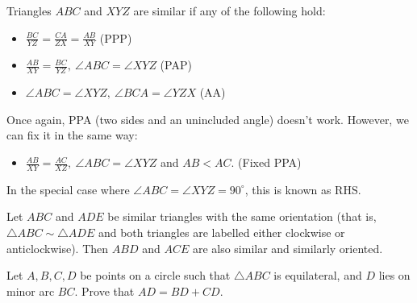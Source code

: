    Triangles $ABC$ and $XYZ$ are similar if any of the following hold:
  \begin{itemize}
    \item $\frac{BC}{YZ}=\frac{CA}{ZX}=\frac{AB}{XY}$ (PPP)
    \item $\frac{AB}{XY}=\frac{BC}{YZ},\ \angle ABC=\angle XYZ$ (PAP)
    \item $\angle ABC=\angle XYZ,\ \angle BCA=\angle YZX$ (AA)
  \end{itemize}
  Once again, PPA (two sides and an unincluded angle) doesn't work. However, we
  can fix it in the same way:
  \begin{itemize}
    \item $\frac{AB}{XY}=\frac{AC}{XZ},\ \angle ABC=\angle XYZ$ and $AB<AC$.
      (Fixed PPA)
  \end{itemize}
  In the special case where $\angle ABC=\angle XYZ=90^\circ$, this is
  known as RHS\@.
  \begin{result}{\label{r:b:g:s:1}}
  Let $ABC$ and $ADE$ be similar triangles with the same orientation (that is,
  $\triangle ABC\sim\triangle ADE$ and both triangles are labelled either
  clockwise or anticlockwise). Then $ABD$ and $ACE$ are also similar and
  similarly oriented.
\end{result}
\begin{problem}{\label{p:b:g:s:1}}
  Let $A,B,C,D$ be points on a circle such that $\triangle ABC$ is equilateral,
  and $D$ lies on minor arc $BC$. Prove that $AD=BD+CD$.
\end{problem}
